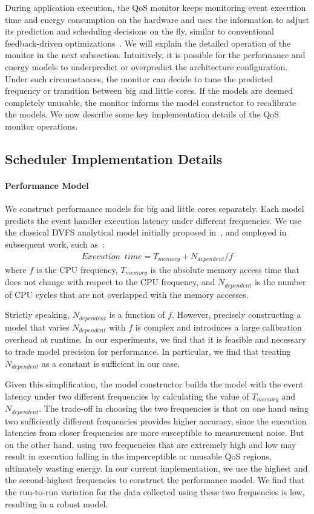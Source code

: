 During application execution, the QoS monitor keeps monitoring event execution time and energy consumption on the hardware and uses the information to adjust its prediction and scheduling decisions on the fly, similar to conventional feedback-driven optimizations~\cite{FDO}. We will explain the detailed operation of the monitor in the next subsection. Intuitively, it is possible for the performance and energy models to underpredict or overpredict the architecture configuration. Under such circumstances, the monitor can decide to tune the predicted frequency or transition between big and little cores. If the models are deemed completely unusable, the monitor informs the model constructor to recalibrate the models. We now describe some key implementation details of the QoS monitor operations.

\subsection{Scheduler Implementation Details}
\label{sec:runtime:ebs:sched}

\paragraph{Performance Model} We construct performance models for big and little cores separately. Each model predicts the event handler execution latency under different frequencies. We use the classical DVFS analytical model initially proposed in~\cite{dvfs_model}, and employed in subsequent work, such as~\cite{dvfs_power}:
\begin{align*}
Execution\,\,\,time = T_{memory} + N_{dependent}/f
\end{align*}
where $f$ is the CPU frequency, $T_{memory}$ is the absolute memory access time that does not change with respect to the CPU frequency, and $N_{dependent}$ is the number of CPU cycles that are not overlapped with the memory accesses.

Strictly speaking, $N_{dependent}$ is a function of $f$. However, precisely constructing a model that varies $N_{dependent}$ with $f$ is complex and introduces a large calibration overhead at runtime. In our experiments, we find that it is feasible and necessary to trade model precision for performance. In particular, we find that treating $N_{dependent}$ as a constant is sufficient in our case.

Given this simplification, the model constructor builds the model with the event latency under two different frequencies by calculating the value of $T_{memory}$ and $N_{dependent}$. The trade-off in choosing the two frequencies is that on one hand using two sufficiently different frequencies provides higher accuracy, since the execution latencies from closer frequencies are more susceptible to measurement noise. But on the other hand, using two frequencies that are extremely high and low may result in execution falling in the  imperceptible or unusable QoS regions, ultimately wasting energy. In our current implementation, we use the highest and the second-highest frequencies to construct the performance model. We find that the run-to-run variation for the data collected using these two frequencies is low, resulting in a robust model.

